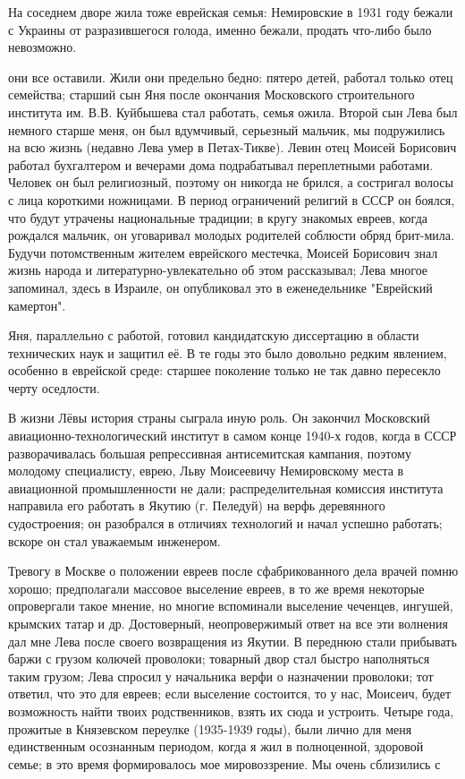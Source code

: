 На соседнем дворе жила тоже еврейская семья: Немировские в 1931 году бежали с Украины от разразившегося голода, именно бежали, продать что-либо было невозможно.

\label{160-1}
они все оставили. Жили они предельно бедно: пятеро детей, работал только отец семейства; старший сын Яня после окончания Московского строительного института им. В.В. Куйбышева стал работать, семья ожила. Второй сын Лева был немного старше меня, он был вдумчивый, серьезный мальчик, мы подружились на всю жизнь (недавно Лева умер в Петах-Тикве). Левин отец Моисей Борисович работал бухгалтером и вечерами дома подрабатывал переплетными работами. Человек он был религиозный, поэтому он никогда не брился, а состригал волосы с лица короткими ножницами. В период ограничений религий в СССР он боялся, что будут утрачены национальные традиции; в кругу знакомых евреев, когда рождался мальчик, он уговаривал молодых родителей соблюсти обряд брит-мила. Будучи потомственным жителем еврейского местечка, Моисей Борисович знал жизнь народа и литературно-увлекательно об этом рассказывал; Лева многое запоминал, здесь в Израиле, он опубликовал это в еженедельнике "Еврейский камертон".

\label{161-1}
Яня, параллельно с работой, готовил кандидатскую диссертацию в области технических наук и защитил её. В те годы это было довольно редким явлением, особенно в еврейской среде: старшее поколение только не так давно пересекло черту оседлости.

В жизни Лёвы история страны сыграла иную роль. Он закончил Московский авиационно-технологический институт в самом конце 1940-х годов, когда в СССР разворачивалась большая репрессивная антисемитская кампания, поэтому молодому специалисту, еврею, Льву Моисеевичу Немировскому места в авиационной промышленности не дали; распределительная комиссия института направила его работать в Якутию (г. Пеледуй) на верфь деревянного судостроения; он разобрался в отличиях технологий и начал успешно работать; вскоре он стал уважаемым инженером.

\label{162-1}
Тревогу в Москве о положении евреев после сфабрикованного дела врачей помню хорошо; предполагали массовое выселение евреев, в то же время некоторые опровергали такое мнение, но многие вспоминали выселение чеченцев, ингушей, крымских татар и др. Достоверный, неопровержимый ответ на все эти волнения дал мне Лева после своего возвращения из Якутии. В переднюю стали прибывать баржи с грузом колючей проволоки; товарный двор стал быстро наполняться таким грузом; Лева спросил у начальника верфи о назначении проволоки; тот ответил, что это для евреев; если выселение состоится, то у нас, Моисеич, будет возможность найти твоих родственников, взять их сюда и устроить. Четыре года, прожитые в Князевском переулке (1935-1939 годы), были лично для меня единственным осознанным периодом, когда я жил в полноценной, здоровой семье; в это время формировалось мое мировоззрение. Мы очень сблизились с

